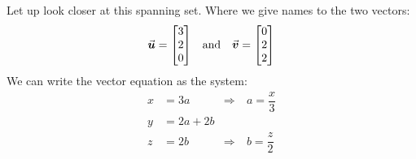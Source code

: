 \documentclass{beamer}
\begin{document}
\begin{frame}
\begin{example}
\begin{overprint}
Let up look closer at this spanning set. Where we give names to the two vectors:
\begin{equation*}
\begin{aligned}
{\vec{\boldsymbol{u}}}=
\begin{bmatrix}
3 \\
2 \\
0 \\
\end{bmatrix} 
& \quad\text{and} &
{\vec{\boldsymbol{v}}}=
\begin{bmatrix}
0 \\
2 \\
2 \\
\end{bmatrix}
\end{aligned}
\end{equation*}
We can write the vector equation as the system:
\begin{equation*}
\begin{aligned}
x&=3a    & \Rightarrow &\ a=\dfrac{x}{3}\\
y&=2a+2b &&\\
z&=2b    & \Rightarrow &\ b=\dfrac{z}{2}\\
\end{aligned}
\end{equation*}
\end{overprint}
\end{example}
\end{frame}
\end{document}

